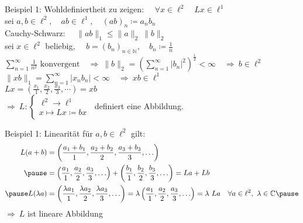 \documentclass[AERbeamer%
,handout%
,optBeamerClassicFormat%
,optLeftEquations   %
]{AERlatex}
\begin{document}
    \begin{frame}{Beispiel 1: Wohldefiniertheit}
        \setlength{\baselineskip}{1.6\baselineskip}
        zu zeigen: $\quad \forall x \in \ell^2 \quad L x \in \ell^1$ \\ \pause
        sei $a, b \in \ell^2, \quad a b \in \ell^1, \quad (a b)_n\coloneqq a_n b_n$ \\ \pause
        Cauchy-Schwarz: $\quad \|a b\|_1 \leq\|a\|_2~\|b\|_2$ \\ \pause
        sei $x \in \ell^2$ beliebig, $\quad b=\left(b_n\right)_{n \in \mathbb{N}}, \quad b_n\coloneqq\frac{1}{n}$ \\ \pause
        $\sum_{n=1}^{\infty} \frac{1}{n^2} \text { konvergent} \quad \Rightarrow ~\|b\|_2=\left(\sum_{n=1}^{\infty}\left|b_n\right|^2\right)^{\frac{1}{2}}<\infty \quad \Rightarrow ~ b \in \ell^2$ \\ \pause
        $\|x b\|_1=\sum_{n=1}^{\infty}\left|x_n b_n\right|<\infty \quad \Rightarrow ~ x b \in \ell^1$ \\ \pause
        $L x=\left(\frac{x_1}{1}, \frac{x_2}{2}, \frac{x_3}{3}, \cdots\right)=x b$ \\ \pause
        \vspace{0.5em}
        $\Rightarrow ~ L:\left\{\begin{array}{l}
                                    \ell^2 \rightarrow \ell^1 \\ x \mapsto L x\coloneqq b x
        \end{array}\right.~$  definiert eine Abbildung.
    \end{frame}
%
    \begin{frame}{Beispiel 1: Linearität}
        \setlength{\baselineskip}{1.6\baselineskip}
        für $a, b \in \ell^2$ gilt:
        \begin{equation*}
            \begin{aligned}
                L(a+b)&=\left(\frac{a_1+b_1}{1}, \frac{a_2+b_2}{2}, \frac{a_3+b_3}{3}, \ldots\right) \\ \pause
                &=\left(\frac{a_1}{1}, \frac{a_2}{2}, \frac{a_3}{3}, \ldots\right)+\left(\frac{b_1}{1}, \frac{b_2}{2}, \frac{b_3}{3}, \ldots\right)=L a+L b \\ \pause
                L(\lambda a)&=\left(\frac{\lambda a_1}{1}, \frac{\lambda a_2}{2}, \frac{\lambda a_3}{3}, \ldots\right)=\lambda\left(\frac{a_1}{1}, \frac{a_2}{2}, \frac{a_3}{3}, \ldots\right)=\lambda ~ L a \quad \forall a \in \ell^{2}, ~\lambda \in \mathbb{C} \pause
            \end{aligned}
        \end{equation*}
        $\Rightarrow ~ L$  ist lineare Abbildung
    \end{frame}
\end{document}
